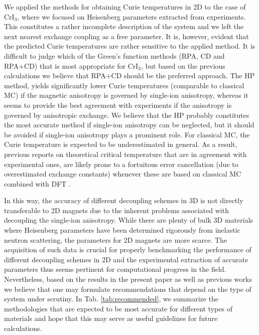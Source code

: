 \documentclass[aps,prb,reprint,floatfix,superscriptaddress]{revtex4-2}
\begin{document}
We applied the methods for obtaining Curie temperatures in 2D to the case of CrI$_3$, where we focused on Heisenberg parameters extracted from experiments. This constitutes a rather incomplete description of the system and we left the next nearest exchange coupling as a free parameter. It is, however, evident that the predicted Curie temperatures are rather sensitive to the applied method. It is difficult to judge which of the Green's function methods (RPA, CD and RPA+CD) that is most appropriate for CrI$_3$, but based on the previous calculations we believe that RPA+CD should be the preferred approach. The HP method, yields significantly lower Curie temperatures (comparable to classical MC) 
if the magnetic anisotropy is governed by single-ion anisotropy, whereas it seems to provide the best agreement with experiments if the anisotropy is governed by anisotropic exchange. We believe that the HP probably constitutes the most accurate method if single-ion anisotropy can be neglected, but it should be avoided if single-ion anisotropy plays a prominent role. 
For classical MC, the Curie temperature is expected to be underestimated in general. As a result, previous reports on theoretical critical temperature that are in agreement with experimental ones, are likely prone to a fortuitous error cancellation (due to overestimated exchange constants) whenever these are based on classical MC combined with DFT \cite{Torelli_2019,Torelli2020,Kabiraj2022,Wines2023}. 

In this way, the accuracy of different decoupling schemes in 3D is not directly transferable to 2D magnets due to the inherent problems associated with decoupling the single-ion anisotropy. While there are plenty of bulk 3D materials where Heisenberg parameters have been determined rigorously from inelastic neutron scattering, the parameters for 2D magnets are more scarce. The acquisition of such data is crucial for properly benchmarking the performance of different decoupling schemes in 2D and the experimental extraction of accurate parameters thus seems pertinent for computational progress in the field. Nevertheless, based on the results in the present paper as well as previous works we believe that one may formulate recommendations that depend on the type of system under scrutiny. In Tab. \ref{tab:recommended}, we summarize the methodologies that are expected to be most accurate for different types of materials and hope that this may serve as useful guidelines for future calculations.
\end{document}
